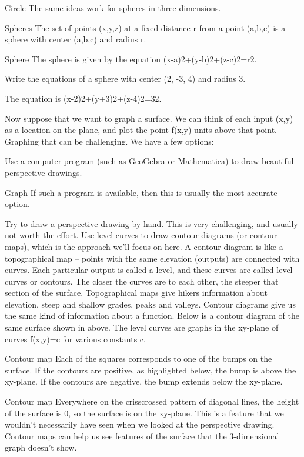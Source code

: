Circle
The same ideas work for spheres in three dimensions.

Spheres
The set of points (x,y,z) at a fixed distance r from a point (a,b,c) is a sphere with center (a,b,c) and radius r.

Sphere
The sphere is given by the equation
(x-a)2+(y-b)2+(z-c)2=r2.
\begin{example}
Write the equations of a sphere with center (2, -3, 4) and radius 3.

\begin{solution} The equation is
(x-2)2+(y+3)2+(z-4)2=32.
\end{solution}\end{example}

Now suppose that we want to graph a surface. We can think of each input (x,y) as a location on the plane, and plot the point f(x,y) units above that point. Graphing that can be challenging. We have a few options:

Use a computer program (such as GeoGebra or Mathematica) to draw beautiful perspective drawings.

Graph
If such a program is available, then this is usually the most accurate option.

Try to draw a perspective drawing by hand. This is very challenging, and usually not worth the effort.
Use level curves to draw contour diagrams (or contour maps), which is the approach we'll focus on here. A contour diagram is like a topographical map – points with the same elevation (outputs) are connected with curves. Each particular output is called a level, and these curves are called level curves or contours. The closer the curves are to each other, the steeper that section of the surface. Topographical maps give hikers information about elevation, steep and shallow grades, peaks and valleys. Contour diagrams give us the same kind of information about a function.
Below is a contour diagram of the same surface shown in above. The level curves are graphs in the xy-plane of curves f(x,y)=c for various constants c.

Contour map
Each of the squares corresponds to one of the bumps on the surface. If the contours are positive, as highlighted below, the bump is above the xy-plane. If the contours are negative, the bump extends below the xy-plane.

Contour map
Everywhere on the crisscrossed pattern of diagonal lines, the height of the surface is 0, so the surface is on the xy-plane. This is a feature that we wouldn't necessarily have seen when we looked at the perspective drawing. Contour maps can help us see features of the surface that the 3-dimensional graph doesn't show.


